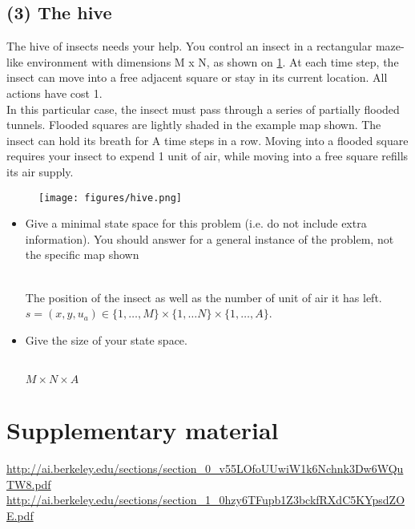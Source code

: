 \documentclass[9pt,a4paper]{extarticle}
\newenvironment{solution}
    {%
    \color{red}
    }
    { 
    \color{black}
    }
\begin{document}
\subsection*{(3) The hive}
The hive of insects needs your help. You control an insect in a rectangular maze-like environment
with dimensions M x N, as shown on \ref{fig:hive}. At each time step,
the insect can move into a free adjacent square or stay in its current
location. All actions have cost 1. \\
In this particular case, the insect must pass through a series of partially
flooded tunnels. Flooded squares are lightly shaded in the example map
shown. The insect can hold its breath for A time steps in a row. Moving
into a flooded square requires your insect to expend 1 unit of air, while
moving into a free square refills its air supply.
\begin{figure}[H]
    \centering
    \texttt{[image: figures/hive.png]}
    \caption{}
    \label{fig:hive}
\end{figure}
\begin{itemize}
    \item Give a minimal state space for this problem (i.e. do not include extra information). You should
answer for a general instance of the problem, not the specific map shown
\begin{solution}
\\
The position of the insect  as well as the number of unit of air it has left. $s = (x, y, u_a) \in \{1, \hdots, M\} \times \{1, \hdots N\} \times \{1, \hdots, A\}$.
\end{solution}
    \item Give the size of your state space.
    \begin{solution}
    \\
    $M\times N \times A$ 
    \end{solution}
\end{itemize}
   \section*{Supplementary material}
   \url{http://ai.berkeley.edu/sections/section_0_v55LOfoUUwiW1k6Nchnk3Dw6WQuTW8.pdf}\\
   \url{http://ai.berkeley.edu/sections/section_1_0hzy6TFupb1Z3bckfRXdC5KYpsdZOE.pdf}\\
\end{document}
